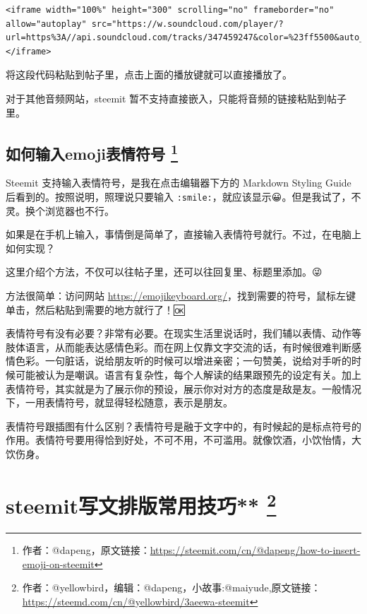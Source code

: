 \documentclass[]{ctexbook}
\begin{document}
\begin{verbatim}
<iframe width="100%" height="300" scrolling="no" frameborder="no" allow="autoplay" src="https://w.soundcloud.com/player/?url=https%3A//api.soundcloud.com/tracks/347459247&color=%23ff5500&auto_play=false&hide_related=false&show_comments=true&show_user=true&show_reposts=false&show_teaser=true&visual=true"></iframe>
\end{verbatim}

将这段代码粘贴到帖子里，点击上面的播放键就可以直接播放了。

对于其他音频网站，steemit 暂不支持直接嵌入，只能将音频的链接粘贴到帖子里。

\hypertarget{emoji}{%
\subsection[如何输入emoji表情符号 ]{\texorpdfstring{如何输入emoji表情符号 \footnote{作者：@dapeng，原文链接：\url{https://steemit.com/cn/@dapeng/how-to-insert-emoji-on-steemit}}}{如何输入emoji表情符号 }}\label{emoji}}

Steemit 支持输入表情符号，是我在点击编辑器下方的 Markdown Styling Guide 后看到的。按照说明，照理说只要输入 \texttt{:smile:}，就应该显示😀。但是我试了，不灵。换个浏览器也不行。🙁

如果是在手机上输入，事情倒是简单了，直接输入表情符号就行。不过，在电脑上如何实现？

这里介绍个方法，不仅可以往帖子里，还可以往回复里、标题里添加。😜

方法很简单：访问网站 \url{https://emojikeyboard.org/}，找到需要的符号，鼠标左键单击，然后粘贴到需要的地方就行了！🆗

表情符号有没有必要？非常有必要。在现实生活里说话时，我们辅以表情、动作等肢体语言，从而能表达感情色彩。而在网上仅靠文字交流的话，有时候很难判断感情色彩。一句脏话，说给朋友听的时候可以增进亲密；一句赞美，说给对手听的时候可能被认为是嘲讽。语言有复杂性，每个人解读的结果跟预先的设定有关。加上表情符号，其实就是为了展示你的预设，展示你对对方的态度是敌是友。一般情况下，一用表情符号，就显得轻松随意，表示是朋友。

表情符号跟插图有什么区别？表情符号是融于文字中的，有时候起的是标点符号的作用。表情符号要用得恰到好处，不可不用，不可滥用。就像饮酒，小饮怡情，大饮伤身。

\hypertarget{pbcyjq}{%
\section[steemit写文排版常用技巧** ]{\texorpdfstring{steemit写文排版常用技巧** \footnote{作者：@yellowbird，编辑：@dapeng，小故事:@maiyude,原文链接：\url{https://steemd.com/cn/@yellowbird/3aeewa-steemit}}}{steemit写文排版常用技巧** }}\label{pbcyjq}}
\end{document}
